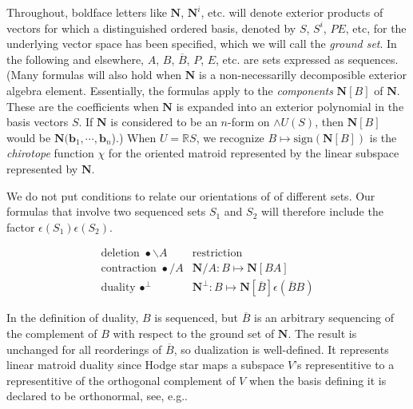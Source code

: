 \documentclass[Unicode]{cedram-alco}
\newcommand{\ext}[1]{\ensuremath{\mathbf{#1}}}
\begin{document}
Throughout, boldface letters like $\ext{N}$, $\ext{N}^{i}$, etc. will denote
exterior products of vectors for which a distinguished ordered
basis, denoted by $S$, $S^{i}$, $PE$, etc,
for the underlying vector space has been specified, which we will
call the \emph{ground set}.
In the following
and elsewhere, $A$, $B$, $\overline{B}$, $P$, $E$, etc. are sets
expressed as sequences.
(Many formulas will also
hold when $\ext{N}$ is a non-necessarilly decomposible exterior algebra element.
Essentially, the formulas apply to the \emph{components} $\ext{N}[B]$ of $\ext{N}$.  These
are the coefficients when $\ext{N}$ is expanded into an exterior polynomial
in the basis vectors $S$.  If $\ext{N}$ is considered to be an $n$-form on $\wedge U(S)$,
then $\ext{N}[B]$ would be $\ext{N}(\ext{b}_1, \cdots, \ext{b}_n$).)
When $U=\mathbb{R}S$, we recognize $B\mapsto\text{sign}(\ext{N}[B])$
is the \emph{chirotope} function $\chi$ for the oriented matroid represented by the
linear subspace represented by $\ext{N}$.

We do not put conditions to relate our orientations of
of different sets.  Our formulas that involve two sequenced sets $S_1$
and $S_2$ will therefore include the factor $\epsilon(S_1)\epsilon(S_2)$.

\begin{defi}\label{extmatdefs}
    \[
    \begin{array}{cc}
\text{deletion\ } \bullet\backslash A  & \text{restriction}  \\
\text{contraction\ }\bullet / A             & \ext{N}/A:B\mapsto\ext{N}[BA]\\
\text{duality\ }\bullet^{\perp} &
\ext{N}^{\perp}:B\mapsto\ext{N}[\overline{B}]\epsilon(\overline{B}B)
    \end{array}
    \]
\end{defi}
    In the definition of duality, $B$ is sequenced,
    but $\overline{B}$ is an arbitrary sequencing of the complement of $B$
    with respect to the ground set of $\ext{N}$.
    The result is unchanged for all reorderings of $\overline{B}$,
    so dualization is well-defined.  It represents linear matroid duality
    since Hodge star maps a subspace $V$'s representitive to a representitive
    of the orthogonal complement of $V$ when the basis defining it is
    declared to be orthonormal, see, e.g.\cite{MarcusFDMuAlPt2}.
\end{document}
